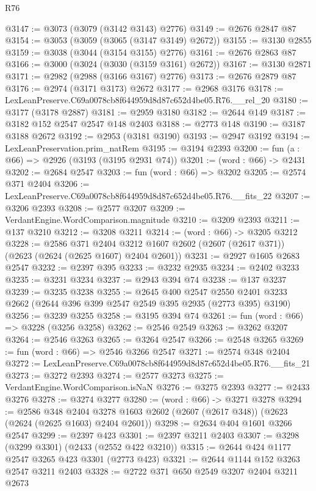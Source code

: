 \begin{lexlean}{R76}
\begin{coremodule}
@3147 := @3073 (@3079 (@3142 @3143) @2776)
@3149 := @2676 @2847 @87
@3154 := @3053 (@3059 (@3065 (@3147 @3149) @2672))
@3155 := @3130 @2855
@3159 := @3038 (@3044 (@3154 @3155) @2776)
@3161 := @2676 @2863 @87
@3166 := @3000 (@3024 (@3030 (@3159 @3161) @2672))
@3167 := @3130 @2871
@3171 := @2982 (@2988 (@3166 @3167) @2776)
@3173 := @2676 @2879 @87
@3176 := @2974 (@3171 @3173) @2672
@3177 := @2968 @3176
@3178 := LexLeanPreserve.C69a0078cb8f644959d8d87c652d4be05.R76.__rel_20
@3180 := @3177 (@3178 @2887)
@3181 := @2959 @3180
@3182 := @2644 @149
@3187 := @3182 @152 @2547 @2547 @148 @2403
@3188 := @2773 @148
@3190 := @3187 @3188 @2672
@3192 := @2953 (@3181 @3190)
@3193 := @2947 @3192
@3194 := LexLeanPreservation.prim_natRem
@3195 := @3194 @2393
@3200 := fun (a : @66) => @2926 (@3193 (@3195 @2931 @74))
@3201 := (word : @66) -> @2431
@3202 := @2684 @2547
@3203 := fun (word : @66) => @3202
@3205 := @2574 @371 @2404
@3206 := LexLeanPreserve.C69a0078cb8f644959d8d87c652d4be05.R76.__fits_22
@3207 := @3206 @2393
@3208 := @2577 @3207
@3209 := VerdantEngine.WordComparison.magnitude
@3210 := @3209 @2393
@3211 := @137 @3210
@3212 := @3208 @3211
@3214 := (word : @66) -> @3205 @3212
@3228 := @2586
    @371
    @2404
    @3212
    @1607
    @2602
    (@2607 (@2617 @371))
    (@2623 (@2624 (@2625 @1607) @2404 @2601))
@3231 := @2927 @1605 @2683 @2547
@3232 := @2397 @395
@3233 := @3232 @2935
@3234 := @2402 @3233
@3235 := @3231 @3234
@3237 := @2943 @394 @74
@3238 := @137 @3237
@3239 := @3235 @3238
@3255 := @2645
    @400
    @2547
    @2550
    @2401
    @3233
    @2662
    (@2644 @396 @399 @2547 @2549 @395 @2935 (@2773 @395) @3190)
@3256 := @3239 @3255
@3258 := @3195 @394 @74
@3261 := fun (word : @66) => @3228 (@3256 @3258)
@3262 := @2546 @2549
@3263 := @3262 @3207
@3264 := @2546 @3263
@3265 := @3264 @2547
@3266 := @2548 @3265
@3269 := fun (word : @66) => @2546 @3266 @2547
@3271 := @2574 @348 @2404
@3272 := LexLeanPreserve.C69a0078cb8f644959d8d87c652d4be05.R76.__fits_21
@3273 := @3272 @2393
@3274 := @2577 @3273
@3275 := VerdantEngine.WordComparison.isNaN
@3276 := @3275 @2393
@3277 := @2433 @3276
@3278 := @3274 @3277
@3280 := (word : @66) -> @3271 @3278
@3294 := @2586
    @348
    @2404
    @3278
    @1603
    @2602
    (@2607 (@2617 @348))
    (@2623 (@2624 (@2625 @1603) @2404 @2601))
@3298 := @2634 @404 @1601 @3266 @2547
@3299 := @2397 @423
@3301 := @2397 @3211 @2403
@3307 := @3298 (@3299 @3301) (@2433 (@2552 @422 @3210))
@3315 := @2644 @424 @1177 @2547 @3265 @423 @3301 (@2773 @423)
@3321 := @2644 @1144 @152 @3263 @2547 @3211 @2403
@3328 := @2722 @371 @650 @2549 @3207 @2404 @3211 @2673

\end{coremodule}
\end{lexlean}
